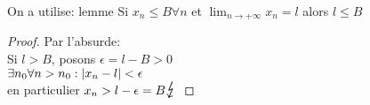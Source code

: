\documentclass[../main.tex]{subfiles}
\begin{document}
\begin{lemma}
On a utilise: lemme  Si $x_n \leq B \forall n $ et $\lim_{n \to  + \infty} x_n = l$ alors $l \leq B$\\
\end{lemma}
\begin{proof}
Par l'absurde:\\
Si $l > B$, posons $ \epsilon = l - B > 0$\\
$\exists n_0 \forall n >n_0: \left\vert x_n -l\right\vert < \epsilon$\\
en particulier $x_n > l - \epsilon = B \contra$ 
\end{proof}







				
\end{document}
